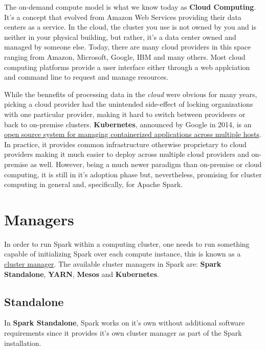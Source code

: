 \documentclass[]{book}
\theoremstyle{definition}
\theoremstyle{definition}
\theoremstyle{definition}
\theoremstyle{remark}
\begin{document}
The on-demand compute model is what we know today as \textbf{Cloud
Computing}. It's a concept that evolved from Amazon Web Services
providing their data centers as a service. In the cloud, the cluster you
use is not owned by you and is neither in your physical building, but
rather, it's a data center owned and managed by someone else. Today,
there are many cloud providers in this space ranging from Amazon,
Microsoft, Google, IBM and many others. Most cloud computing platforms
provide a user interface either through a web applciation and command
line to request and manage resources.

While the bennefits of processing data in the \emph{cloud} were obvious
for many years, picking a cloud provider had the unintended side-effect
of locking organizations with one particular provider, making it hard to
switch between provideers or back to on-premise clusters.
\textbf{Kubernetes}, announced by Google in 2014, is an
\href{https://github.com/kubernetes/kubernetes/}{open source system for
managing containerized applications across multiple hosts}. In practice,
it provides common infrastructure otherwise proprietary to cloud
providers making it much easier to deploy across multiple cloud
providers and on-premise as well. However, being a much newer paradigm
than on-premise or cloud computing, it is still in it's adoption phase
but, nevertheless, promising for cluster computing in general and,
specifically, for Apache Spark.

\hypertarget{managers}{%
\section{Managers}\label{managers}}

In order to run Spark within a computing cluster, one needs to run
something capable of initializing Spark over each compute instance, this
is known as a
\href{https://en.wikipedia.org/wiki/Cluster_manager}{cluster manager}.
The available cluster managers in Spark are: \textbf{Spark Standalone},
\textbf{YARN}, \textbf{Mesos} and \textbf{Kubernetes}.

\hypertarget{clusters-standalone}{%
\subsection{Standalone}\label{clusters-standalone}}

In \textbf{Spark Standalone}, Spark works on it's own without additional
software requirements since it provides it's own cluster manager as part
of the Spark installation.
\end{document}
